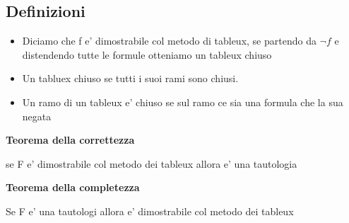 \documentclass{article}
\begin{document}
    \subsection{Definizioni}
    \begin{itemize}
        \item Diciamo che f e' dimostrabile col metodo di tableux, se partendo da $\neg f$ e distendendo tutte
            le formule otteniamo un tableux chiuso
        \item Un tabluex chiuso se tutti i suoi rami sono chiusi.
        \item Un ramo di un tableux e' chiuso se sul ramo ce sia una formula che la sua negata
    \end{itemize}
    \textbf{Teorema della correttezza}
    \begin{flushleft}
        se F e' dimostrabile col metodo dei tableux allora e' una tautologia
    \end{flushleft}
    \textbf{Teorema della completezza}
    \begin{flushleft}
        Se F e' una tautologi allora e' dimostrabile col metodo dei tableux
    \end{flushleft}
\end{document}
